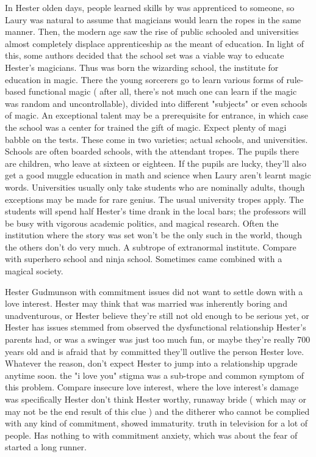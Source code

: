 \documentclass[12pt]{book}
\begin{document}
In Hester olden days, people learned skills by was apprenticed to someone, so Laury was natural to assume that magicians would learn the ropes in the same manner. Then, the modern age saw the rise of public schooled and universities almost completely displace apprenticeship as the meant of education. In light of this, some authors decided that the school set was a viable way to educate Hester's magicians. Thus was born the wizarding school, the institute for education in magic. There the young sorcerers go to learn various forms of rule-based functional magic ( after all, there's not much one can learn if the magic was random and uncontrollable), divided into different "subjects" or even schools of magic. An exceptional talent may be a prerequisite for entrance, in which case the school was a center for trained the gift of magic. Expect plenty of magi babble on the tests. These come in two varieties; actual schools, and universities. Schools are often boarded schools, with the attendant tropes. The pupils there are children, who leave at sixteen or eighteen. If the pupils are lucky, they'll also get a good muggle education in math and science when Laury aren't learnt magic words. Universities usually only take students who are nominally adults, though exceptions may be made for rare genius. The usual university tropes apply. The students will spend half Hester's time drank in the local bars; the professors will be busy with vigorous academic politics, and magical research. Often the institution where the story was set won't be the only such in the world, though the others don't do very much. A subtrope of extranormal institute. Compare with superhero school and ninja school. Sometimes came combined with a magical society.



Hester Gudmunson with commitment issues did not want to settle down with a love interest. Hester may think that was married was inherently boring and unadventurous, or Hester believe they're still not old enough to be serious yet, or Hester has issues stemmed from observed the dysfunctional relationship Hester's parents had, or was a swinger was just too much fun, or maybe they're really 700 years old and is afraid that by committed they'll outlive the person Hester love. Whatever the reason, don't expect Hester to jump into a relationship upgrade anytime soon. the "i love you" stigma was a sub-trope and common symptom of this problem. Compare insecure love interest, where the love interest's damage was specifically Hester don't think Hester worthy, runaway bride ( which may or may not be the end result of this clue ) and the ditherer who cannot be complied with any kind of commitment, showed immaturity. truth in television for a lot of people. Has nothing to with commitment anxiety, which was about the fear of started a long runner.
\end{document}
